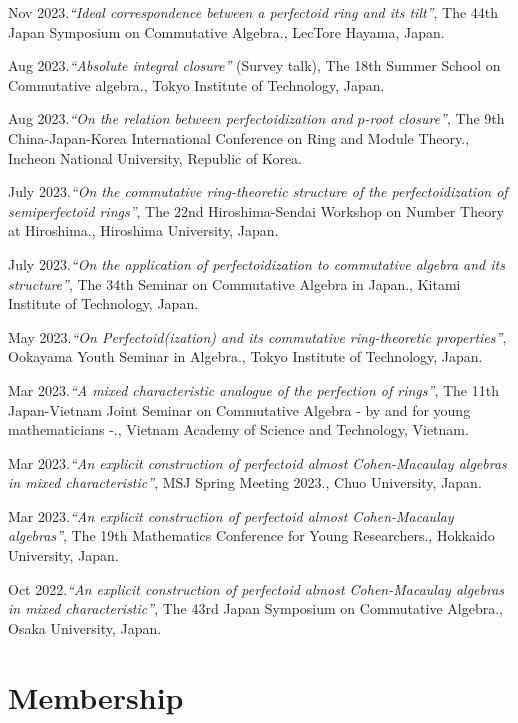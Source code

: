 \documentclass[10pt,a4paper,sans]{moderncv}
\begin{document}
\begin{etaremune}
  \item Nov 2023.\emph{``Ideal correspondence between a perfectoid ring and its tilt''}, \textsf{The 44th Japan Symposium on Commutative Algebra.}, LecTore Hayama, Japan.
  \item Aug 2023.\emph{``Absolute integral closure''} (Survey talk), \textsf{The 18th Summer School on Commutative algebra.}, Tokyo Institute of Technology, Japan.
  \item Aug 2023.\emph{``On the relation between perfectoidization and \(p\)-root closure''}, \textsf{The 9th China-Japan-Korea International Conference on Ring and Module Theory.}, Incheon National University, Republic of Korea.
  \item July 2023.\emph{``On the commutative ring-theoretic structure of the perfectoidization of semiperfectoid rings''}, \textsf{The 22nd Hiroshima-Sendai Workshop on Number Theory at Hiroshima.}, Hiroshima University, Japan.
  \item July 2023.\emph{``On the application of perfectoidization to commutative algebra and its structure''}, \textsf{The 34th Seminar on Commutative Algebra in Japan.}, Kitami Institute of Technology, Japan.
  \item May 2023.\emph{``On Perfectoid(ization) and its commutative ring-theoretic properties''}, \textsf{Ookayama Youth Seminar in Algebra.}, Tokyo Institute of Technology, Japan.
  \item Mar 2023.\emph{``A mixed characteristic analogue of the perfection of rings''}, \textsf{The 11th Japan-Vietnam Joint Seminar on Commutative Algebra - by and for young mathematicians -.}, Vietnam Academy of Science and Technology, Vietnam.
  \item Mar 2023.\emph{``An explicit construction of perfectoid almost Cohen-Macaulay algebras in mixed characteristic''}, \textsf{MSJ Spring Meeting 2023.}, Chuo University, Japan.
  \item Mar 2023.\emph{``An explicit construction of perfectoid almost Cohen-Macaulay algebras''}, \textsf{The 19th Mathematics Conference for Young Researchers.}, Hokkaido University, Japan.
  \item Oct 2022.\emph{``An explicit construction of perfectoid almost Cohen-Macaulay algebras in mixed characteristic''}, \textsf{The 43rd Japan Symposium on Commutative Algebra.}, Osaka University, Japan.
\end{etaremune}


\section{Membership}
\end{document}
